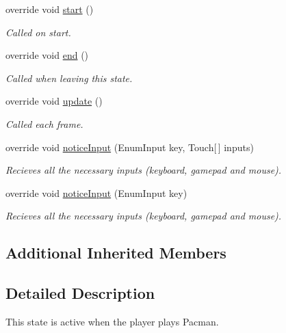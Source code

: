 \begin{DoxyCompactItemize}
override void \hyperlink{class_pacman_state_ab3f48dc99037d2a3b43909bfd4e67268}{start} ()
\begin{DoxyCompactList}\small\item\em Called on start.\end{DoxyCompactList}\item 
override void \hyperlink{class_pacman_state_a9355f6774387872a0f54d74e064a5aa6}{end} ()
\begin{DoxyCompactList}\small\item\em Called when leaving this state.\end{DoxyCompactList}\item 
override void \hyperlink{class_pacman_state_a7a5922c97a9ccb7380094ef02f3d1022}{update} ()
\begin{DoxyCompactList}\small\item\em Called each frame.\end{DoxyCompactList}\item 
override void \hyperlink{class_pacman_state_aa2bd54c78c9e8fa9bd7bbbaeb88fc203}{notice\-Input} (Enum\-Input key, Touch\mbox{[}$\,$\mbox{]} inputs)
\begin{DoxyCompactList}\small\item\em Recieves all the necessary inputs (keyboard, gamepad and mouse).\end{DoxyCompactList}\item 
override void \hyperlink{class_pacman_state_aced74f286f73da4816511fc78de7b88b}{notice\-Input} (Enum\-Input key)
\begin{DoxyCompactList}\small\item\em Recieves all the necessary inputs (keyboard, gamepad and mouse).\end{DoxyCompactList}\end{DoxyCompactItemize}
\subsection*{Additional Inherited Members}


\subsection{Detailed Description}
This state is active when the player plays Pacman.



